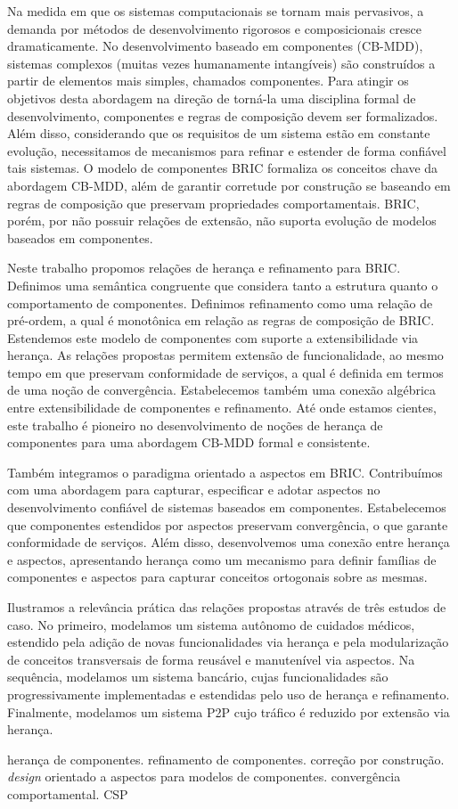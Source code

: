 \vspace*{-.5cm}

Na medida em que os sistemas computacionais se tornam mais pervasivos, a demanda por métodos de desenvolvimento rigorosos e composicionais cresce dramaticamente. No desenvolvimento baseado em componentes (CB-MDD), sistemas complexos (muitas vezes humanamente intangíveis) são construídos a partir de elementos mais simples, chamados componentes. Para atingir os objetivos desta abordagem na direção de torná-la uma disciplina formal de desenvolvimento, componentes e regras de composição devem ser formalizados. Além disso, considerando que os requisitos de um sistema estão em constante evolução, necessitamos de mecanismos para refinar e estender de forma confiável tais sistemas. O modelo de componentes BRIC formaliza os conceitos chave da abordagem CB-MDD, além de garantir corretude por construção se baseando em regras de composição que preservam propriedades comportamentais. BRIC, porém, por não possuir relações de extensão, não suporta evolução de modelos baseados em componentes.

Neste trabalho propomos relações de herança e refinamento para BRIC. Definimos uma semântica congruente que considera tanto a estrutura quanto o comportamento de componentes. Definimos refinamento como uma relação de pré-ordem, a qual é monotônica em relação as regras de composição de BRIC. Estendemos este modelo de componentes com suporte a extensibilidade via herança. As relações propostas permitem extensão de funcionalidade, ao mesmo tempo em que preservam conformidade de serviços, a qual é definida em termos de uma noção de convergência. Estabelecemos também uma conexão algébrica entre extensibilidade de componentes e refinamento. Até onde estamos cientes, este trabalho é pioneiro no desenvolvimento de noções de herança de componentes para uma abordagem CB-MDD formal e consistente. 

Também integramos o paradigma orientado a aspectos em BRIC. Contribuímos com uma abordagem para capturar, especificar e adotar aspectos no desenvolvimento confiável de sistemas baseados em componentes. Estabelecemos que componentes estendidos por aspectos preservam convergência, o que garante conformidade de serviços. Além disso, desenvolvemos uma conexão entre herança e aspectos, apresentando herança como um mecanismo para definir famílias de componentes e aspectos para capturar conceitos ortogonais sobre as mesmas.

Ilustramos a relevância prática das relações propostas através de três estudos de caso. No primeiro, modelamos um sistema autônomo de cuidados médicos, estendido pela adição de novas funcionalidades via herança e pela modularização de conceitos transversais de forma reusável e manutenível via aspectos. Na sequência, modelamos um sistema bancário, cujas funcionalidades são progressivamente implementadas e estendidas pelo uso de herança e refinamento. Finalmente, modelamos um sistema P2P cujo tráfico é reduzido por extensão via herança.

\begin{keywords}
herança de componentes. refinamento de componentes. correção por construção. \textit{design} orientado a aspectos para modelos de componentes. convergência comportamental. CSP
\end{keywords}

